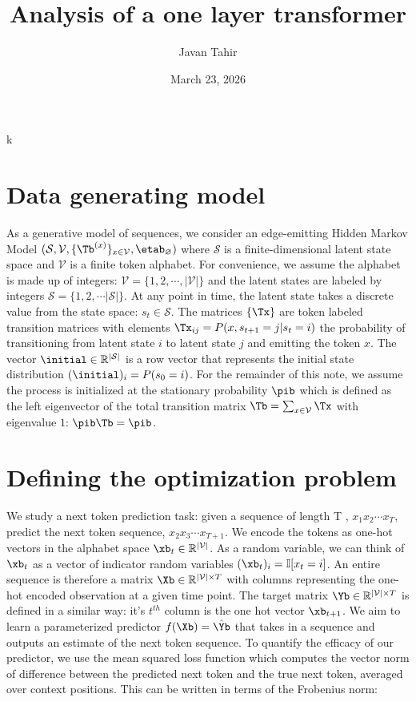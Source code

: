 k\documentclass{article}
\title{Analysis of a one layer transformer}
\author{Javan Tahir}
\date{March 23, 2026}
\begin{document}
\maketitle

\section{Data generating model}
As a generative model of sequences, we consider an edge-emitting Hidden Markov Model $(\mathcal{S}, \mathcal{V}, \{ \Tb^{(x)}\}_{{x \in \mathcal{V}}}, \etab_{\varnothing})$ where $\mathcal{S}$ is a finite-dimensional latent state space and $\mathcal{V}$ is a finite token alphabet. For convenience, we assume the alphabet is made up of integers: $\mathcal{V} = \{1, 2, \cdots, |\mathcal{V}|\}$ and the latent states are labeled by integers $\mathcal{S} = \{1,2,\cdots |\mathcal{S}|\}$. At any point in time, the latent state takes a discrete value from the state space: $s_t \in \mathcal{S}$. The matrices $\{\Tx\}$ are token labeled transition matrices with elements $\Tx_{ij} = P(x, s_{t+1} = j | s_t = i)$ the probability of transitioning from latent state $i$ to latent state $j$ and emitting the token $x$. The vector $\initial \in \mathbb{R}^{|\mathcal{S}|}$ is a row vector that represents the initial state distribution $(\initial)_i = P(s_0 = i)$. For the remainder of this note, we assume the process is initialized at the stationary probability $\pib$ which is defined as the left eigenvector of the total transition matrix $\Tb = \sum_{x\in \mathcal{V}} \Tx$ with eigenvalue $1$: $\pib \Tb = \pib$. 

\section{Defining the optimization problem}
We study a next token prediction task: given a sequence of length T , $x_1x_2\cdots x_T$, predict the next token sequence, $x_2x_3\cdots x_{T+1}$. We encode the tokens as one-hot vectors in the alphabet space $\xb_t \in \mathbb{R}^{|\mathcal{V}|}$. As a random variable, we can think of $\xb_t$ as a vector of indicator random variables $(\xb_t)_i = \mathbb{I}[x_t = i]$. An entire sequence is therefore a matrix $\Xb \in \mathbb{R}^{|\mathcal{V}| \times T}$ with columns representing the one-hot encoded observation at a given time point. The target matrix $\Yb \in \mathbb{R}^{|\mathcal{V}| \times T}$ is defined in a similar way: it's $t^{th}$ column is the one hot vector $\xb_{t+1}$. We aim to learn a parameterized predictor $f(\Xb) = \hat{\Yb}$ that takes in a sequence and outputs an estimate of the next token sequence. To quantify the efficacy of our predictor, we use the mean squared loss function which computes the vector norm of difference between the predicted next token and the true next token, averaged over context positions. This can be written in terms of the Frobenius norm: 
\end{document}
